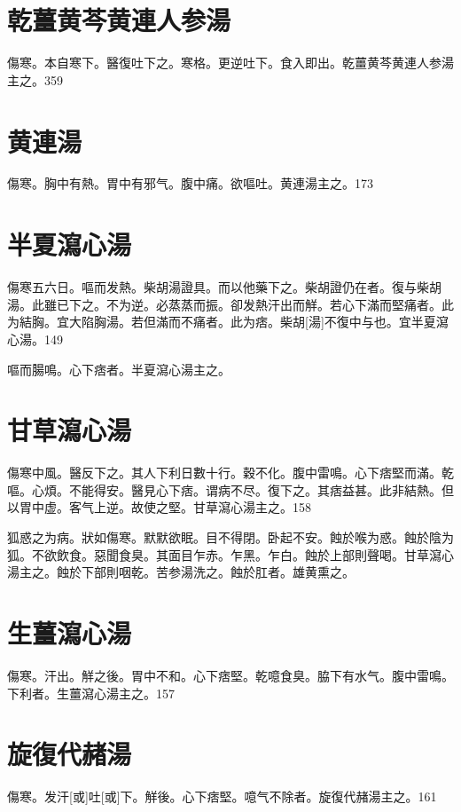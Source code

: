 \documentclass[12pt,oneside,UTF8,b5paper]{ctexbook}她她她她她她她
\begin{document}
\section{乾薑黄芩黄連人参湯}

傷寒。本自寒下。醫復吐下之。寒格。更逆吐下。食入即出。乾薑黄芩黄連人参湯主之。359

\section{黄連湯}

傷寒。胸中有熱。胃中有邪气。腹中痛。欲嘔吐。黄連湯主之。173

\section{半夏瀉心湯}

傷寒五六日。嘔而发熱。柴胡湯證具。而以他藥下之。柴胡證仍在者。復与柴胡湯。此雖已下之。不为逆。必蒸蒸而振。卻发熱汗出而觧。若心下滿而堅痛者。此为結胸。宜大陷胸湯。若但滿而不痛者。此为痞。柴胡[湯]不復中与也。宜半夏瀉心湯。149

嘔而腸鳴。心下痞者。半夏瀉心湯主之。

\section{甘草瀉心湯}

傷寒中風。醫反下之。其人下利日數十行。穀不化。腹中雷鳴。心下痞堅而滿。乾嘔。心煩。不能得安。醫見心下痞。谓病不尽。復下之。其痞益甚。此非結熱。但以胃中虚。客气上逆。故使之堅。甘草瀉心湯主之。158

狐惑之为病。狀如傷寒。默默欲眠。目不得閉。卧起不安。蝕於喉为惑。蝕於陰为狐。不欲飲食。惡聞食臭。其面目乍赤。乍黑。乍白。蝕於上部則聲喝。甘草瀉心湯主之。蝕於下部則咽乾。苦参湯洗之。蝕於肛者。雄黄熏之。

\section{生薑瀉心湯}

傷寒。汗出。觧之後。胃中不和。心下痞堅。乾噫食臭。脇下有水气。腹中雷鳴。下利者。生薑瀉心湯主之。157

\section{旋復代赭湯}

傷寒。发汗[或]吐[或]下。觧後。心下痞堅。噫气不除者。旋復代赭湯主之。161
\end{document}
